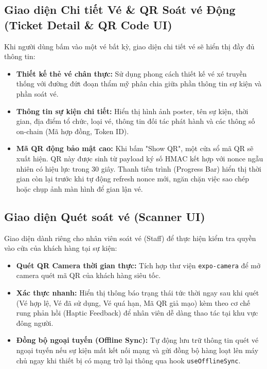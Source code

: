 \documentclass[a4paper]{report}
\begin{document}
\subsection{Giao diện Chi tiết Vé \& QR Soát vé Động (Ticket Detail \& QR Code UI)}
Khi người dùng bấm vào một vé bất kỳ, giao diện chi tiết vé sẽ hiển thị đầy đủ thông tin:
\begin{itemize}
    \item \textbf{Thiết kế thẻ vé chân thực:} Sử dụng phong cách thiết kế vé xé truyền thống với đường đứt đoạn thẩm mỹ phân chia giữa phần thông tin sự kiện và phần soát vé.
    \item \textbf{Thông tin sự kiện chi tiết:} Hiển thị hình ảnh poster, tên sự kiện, thời gian, địa điểm tổ chức, loại vé, thông tin đối tác phát hành và các thông số on-chain (Mã hợp đồng, Token ID).
    \item \textbf{Mã QR động bảo mật cao:} Khi bấm "Show QR", một cửa sổ mã QR sẽ xuất hiện. QR này được sinh từ payload ký số HMAC kết hợp với nonce ngẫu nhiên có hiệu lực trong 30 giây. Thanh tiến trình (Progress Bar) hiển thị thời gian còn lại trước khi tự động refresh nonce mới, ngăn chặn việc sao chép hoặc chụp ảnh màn hình để gian lận vé.
\end{itemize}

\subsection{Giao diện Quét soát vé (Scanner UI)}
Giao diện dành riêng cho nhân viên soát vé (Staff) để thực hiện kiểm tra quyền vào cửa của khách hàng tại sự kiện:
\begin{itemize}
    \item \textbf{Quét QR Camera thời gian thực:} Tích hợp thư viện \texttt{expo-camera} để mở camera quét mã QR của khách hàng siêu tốc.
    \item \textbf{Xác thực nhanh:} Hiển thị thông báo trạng thái tức thời ngay sau khi quét (Vé hợp lệ, Vé đã sử dụng, Vé quá hạn, Mã QR giả mạo) kèm theo cơ chế rung phản hồi (Haptic Feedback) để nhân viên dễ dàng thao tác tại khu vực đông người.
    \item \textbf{Đồng bộ ngoại tuyến (Offline Sync):} Tự động lưu trữ thông tin quét vé ngoại tuyến nếu sự kiện mất kết nối mạng và gửi đồng bộ hàng loạt lên máy chủ ngay khi thiết bị có mạng trở lại thông qua hook \texttt{useOfflineSync}.
\end{itemize}

\clearpage
\end{document}
